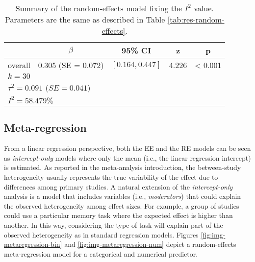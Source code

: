 \documentclass[
  man,floatsintext]{apa6}
\begin{document}
\begin{table}[H]

\caption{\label{tab:res-random-effects-i2}Summary of the random-effects model fixing the \(I^2\) value. Parameters are the same as described in Table \ref{tab:res-random-effects}.}
\centering
\fontsize{9}{11}\selectfont
\begin{tabular}[t]{ccccc}
\toprule
 & $\beta$ & 95\% CI & z & p\\
\midrule
overall & 0.305 (SE = 0.072) & $[0.164, 0.447]$ & 4.226 & < 0.001\\
\bottomrule
\multicolumn{5}{l}{\textsuperscript{} $k = 30$}\\
\multicolumn{5}{l}{\textsuperscript{} $\tau^2 = 0.091$ ($SE = 0.041$)}\\
\multicolumn{5}{l}{\textsuperscript{} $I^2 = 58.479\%$}\\
\end{tabular}
\end{table}

\normalsize

\subsection{Meta-regression}\label{metareg}

From a linear regression perspective, both the EE and the RE models can be seen as \emph{intercept-only} models where only the mean (i.e., the linear regression intercept) is estimated. As reported in the meta-analysis introduction, the between-study heterogeneity usually represents the true variability of the effect due to differences among primary studies. A natural extension of the \emph{intercept-only} analysis is a model that includes variables (i.e., \emph{moderators}) that could explain the observed heterogeneity among effect sizes. For example, a group of studies could use a particular memory task where the expected effect is higher than another. In this way, considering the type of task will explain part of the observed heterogeneity as in standard regression models. Figures \ref{fig:img-metaregression-bin} and \ref{fig:img-metaregression-num} depict a random-effects meta-regression model for a categorical and numerical predictor.

\scriptsize
\end{document}
